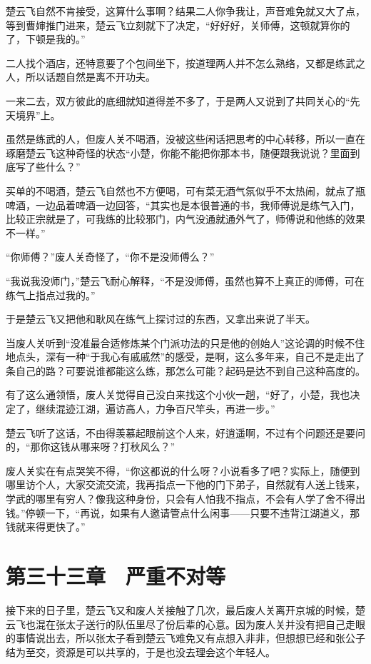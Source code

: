 楚云飞自然不肯接受，这算什么事啊？结果二人你争我让，声音难免就又大了点，等到曹婶推门进来，楚云飞立刻就下了决定，“好好好，关师傅，这顿就算你的了，下顿是我的。”

二人找个酒店，还特意要了个包间坐下，按道理两人并不怎么熟络，又都是练武之人，所以话题自然是离不开功夫。

一来二去，双方彼此的底细就知道得差不多了，于是两人又说到了共同关心的“先天境界”上。

虽然是练武的人，但废人关不喝酒，没被这些闲话把思考的中心转移，所以一直在琢磨楚云飞这种奇怪的状态“小楚，你能不能把你那本书，随便跟我说说？里面到底写了些什么？”

买单的不喝酒，楚云飞自然也不方便喝，可有菜无酒气氛似乎不太热闹，就点了瓶啤酒，一边品着啤酒一边回答，“其实也是本很普通的书，我师傅说是练气入门，比较正宗就是了，可我练的比较邪门，内气没通就通外气了，师傅说和他练的效果不一样。”

“你师傅？”废人关奇怪了，“你不是没师傅么？”

“我说我没师门，”楚云飞耐心解释，“不是没师傅，虽然也算不上真正的师傅，可在练气上指点过我的。”

于是楚云飞又把他和耿风在练气上探讨过的东西，又拿出来说了半天。

当废人关听到“没准最合适修炼某个门派功法的只是他的创始人”这论调的时候不住地点头，深有一种“于我心有戚戚然”的感受，是啊，这么多年来，自己不是走出了条自己的路？可要说谁都能这么练，那怎么可能？起码是达不到自己这种高度的。

有了这么通领悟，废人关觉得自己没白来找这个小伙一趟，“好了，小楚，我也决定了，继续混迹江湖，遍访高人，力争百尺竿头，再进一步。”

楚云飞听了这话，不由得羡慕起眼前这个人来，好逍遥啊，不过有个问题还是要问的，“那你这钱从哪来呀？打秋风么？”

废人关实在有点哭笑不得，“你这都说的什么呀？小说看多了吧？实际上，随便到哪里访个人，大家交流交流，我再指点一下他的门下弟子，自然就有人送上钱来，学武的哪里有穷人？像我这种身份，只会有人怕我不指点，不会有人学了舍不得出钱。”停顿一下，“再说，如果有人邀请管点什么闲事——只要不违背江湖道义，那钱就来得更快了。”

\section{第三十三章　严重不对等}

接下来的日子里，楚云飞又和废人关接触了几次，最后废人关离开京城的时候，楚云飞也混在张太子送行的队伍里尽了份后辈的心意。因为废人关并没有把自己走眼的事情说出去，所以张太子看到楚云飞难免又有点想入非非，但想想已经和张公子结为至交，资源是可以共享的，于是也没去理会这个年轻人。

